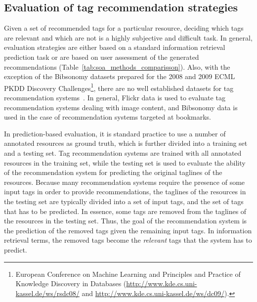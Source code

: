 \subsection{Evaluation of tag recommendation strategies}
\label{sec:soa:evluation_of_tag_recommendation}

Given a set of recommended tags for a particular resource, deciding which tags are relevant and which are not is a highly subjective and difficult task.
In general, evaluation strategies are either based on a standard information retrieval prediction task or are based on user assessment of the generated recommendations (Table~\ref{tab:soa_methods_comparisson}). Also, with the exception of the Bibsonomy datasets prepared for the 2008 and 2009 ECML PKDD Discovery Challenges\footnote{European Conference on Machine Learning and Principles and Practice of Knowledge Discovery in Databases (\url{http://www.kde.cs.uni-kassel.de/ws/rsdc08/} and \url{http://www.kde.cs.uni-kassel.de/ws/dc09/}).}, there are no well established datasets for tag recommendation systems~\citep{Wang2012}. 
In general, Flickr data is used to evaluate tag recommendation systems dealing with image content, and Bibsonomy data is used in the case of recommendation systems targeted at bookmarks.


In prediction-based evaluation, it is standard practice to use a number of annotated resources as ground truth, which is further divided into a training set and a testing set. Tag recommendation systems are trained with all annotated resources in the training set, while the testing set is used to evaluate the ability of the recommendation system for predicting the original taglines of the resources.
Because many recommendation systems require the presence of some input tags in order to provide recommendations, the taglines of the resources in the testing set are typically divided into a set of input tags, and the set of tags that has to be predicted. 
In essence, some tags are removed from the taglines of the resources in the testing set.
Thus, the goal of the recommendation system is the prediction of the removed tags given the remaining input tags. In information retrieval terms, the removed tags become the \emph{relevant} tags that the system has to predict.

